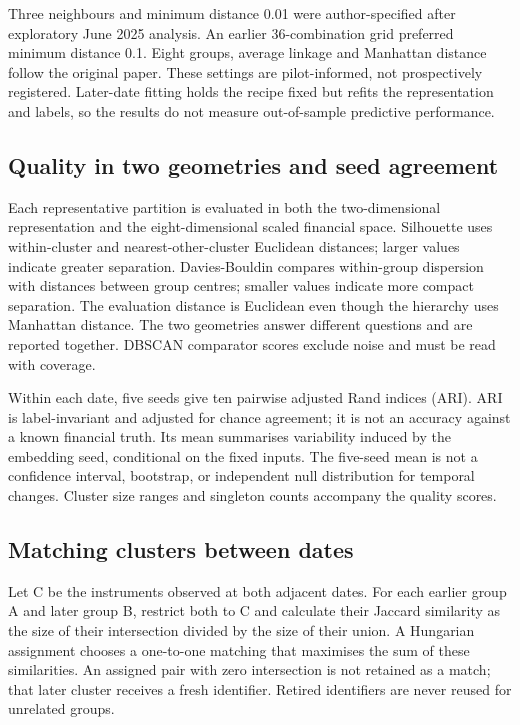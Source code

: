 Three neighbours and minimum distance 0.01 were author-specified after exploratory June 2025 analysis. An earlier 36-combination grid preferred minimum distance 0.1. Eight groups, average linkage and Manhattan distance follow the original paper. These settings are pilot-informed, not prospectively registered. Later-date fitting holds the recipe fixed but refits the representation and labels, so the results do not measure out-of-sample predictive performance.


\subsection{Quality in two geometries and seed agreement}

Each representative partition is evaluated in both the two-dimensional representation and the eight-dimensional scaled financial space. Silhouette uses within-cluster and nearest-other-cluster Euclidean distances; larger values indicate greater separation. Davies-Bouldin compares within-group dispersion with distances between group centres; smaller values indicate more compact separation. The evaluation distance is Euclidean even though the hierarchy uses Manhattan distance. The two geometries answer different questions and are reported together. DBSCAN comparator scores exclude noise and must be read with coverage.


Within each date, five seeds give ten pairwise adjusted Rand indices (ARI). ARI is label-invariant and adjusted for chance agreement; it is not an accuracy against a known financial truth. Its mean summarises variability induced by the embedding seed, conditional on the fixed inputs. The five-seed mean is not a confidence interval, bootstrap, or independent null distribution for temporal changes. Cluster size ranges and singleton counts accompany the quality scores.


\subsection{Matching clusters between dates}

Let C be the instruments observed at both adjacent dates. For each earlier group A and later group B, restrict both to C and calculate their Jaccard similarity as the size of their intersection divided by the size of their union. A Hungarian assignment chooses a one-to-one matching that maximises the sum of these similarities. An assigned pair with zero intersection is not retained as a match; that later cluster receives a fresh identifier. Retired identifiers are never reused for unrelated groups.



